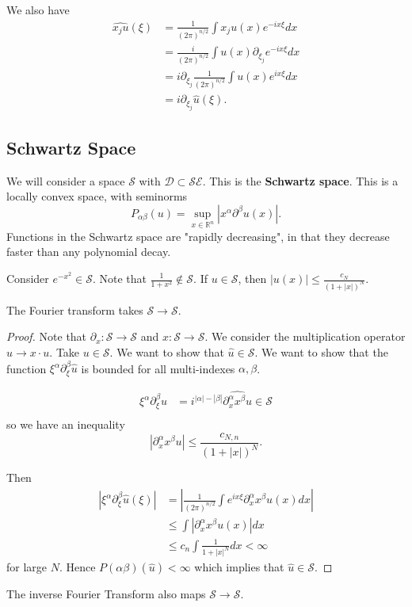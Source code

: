 \documentclass[11pt]{scrartcl}
\newcommand{\R}{\mathbb{R}}
\renewcommand{\hat}{\widehat}
\begin{document}
We also have 
\begin{align*}
\hat{x_ju}(\xi) &= \frac{1}{(2\pi)^{n/2}} \int x_j u(x) e^{-ix\xi}dx\\
&= \frac{i}{(2\pi)^{n/2}} \int u(x)\partial_{\xi_j}e^{-ix\xi}dx \\
&= i\partial_{\xi_j} \frac{1}{(2\pi)^{n/2}}\int u(x)e^{ix\xi}dx \\
&= i\partial_{\xi_j} \hat{u}(\xi).
\end{align*}
\subsection{Schwartz Space}
We will consider a space $\mathcal{S}$ with $\mathcal{D} \subset \mathcal S \mathcal E$.  This is the \textbf{Schwartz space}.
This is a locally convex space, with seminorms
$$P_{\alpha\beta}(u) = \sup_{x \in \R^n}|x^{\alpha} \partial^{\beta}u(x)|.$$
Functions in the Schwartz space are "rapidly decreasing", in that they decrease faster than any polynomial decay.
\begin{example} Consider $e^{-x^2} \in \mathcal S$. Note that $\frac{1}{1+x^2} \not \in \mathcal S$.  If $u \in \mathcal S$, then $|u(x)| \le \frac{c_N}{(1 + |x|)^N}$.
\end{example}
\begin{proposition} The Fourier transform takes $\mathcal S \to \mathcal S$.
\end{proposition}
\begin{proof}
Note that $\partial_x: \mathcal S \rightarrow \mathcal S$ and $x: \mathcal S \rightarrow \mathcal S$.  We consider the multiplication operator $u \to x \cdot u$.  Take $u \in \mathcal S$.  We want to show that $\hat{u} \in \mathcal S$.  We want to show that the function $\xi^{\alpha} \partial_{\xi}^{\beta} \hat{u}$ is bounded for all multi-indexes $\alpha, \beta$.

\begin{align*}
\xi^{\alpha} \partial_\xi^{\beta} \hat{u} &= i^{|\alpha| - |\beta|}\hat{\partial_x^{\alpha} x^{\beta} u} \in \mathcal S \\
\end{align*}
so we have an inequality
$$|\partial_x^{\alpha} x^{\beta} u| \le \frac{c_{N, n}}{(1 + |x|)^N}.$$

Then
\begin{align*}
 |\xi^{\alpha}\partial_\xi^{\beta} \hat{u}(\xi)| &= \left|\frac{1}{(2\pi)^{n/2}}\int e^{ix\xi}\partial_x^{\alpha}x^{\beta}u(x)dx\right| \\
 &\le \int |\partial_x^{\alpha}x^{\beta} u(x)|dx \\
 &\le c_n \int \frac{1}{1+|x|^N}dx < \infty
\end{align*}
for large $N$.  Hence $P(\alpha\beta)(\hat{u}) < \infty$ which implies that $\hat{u} \in \mathcal S$.
\end{proof}
\begin{corollary} The inverse Fourier Transform also maps $\mathcal S \to \mathcal S$.
\end{corollary}
\end{document}
